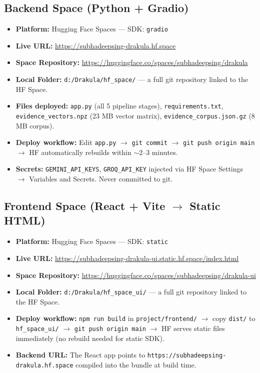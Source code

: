 \documentclass[11pt,a4paper]{article}
\begin{document}
\subsection*{Backend Space (Python + Gradio)}
\begin{itemize}[leftmargin=1.5em, itemsep=3pt]
    \item \textbf{Platform:} Hugging Face Spaces — SDK: \texttt{gradio}
    \item \textbf{Live URL:} \url{https://subhadeepsing-drakula.hf.space}
    \item \textbf{Space Repository:} \url{https://huggingface.co/spaces/subhadeepsing/drakula}
    \item \textbf{Local Folder:} \texttt{d:/Drakula/hf\_space/} — a full git repository linked to the HF Space.
    \item \textbf{Files deployed:} \texttt{app.py} (all 5 pipeline stages), \texttt{requirements.txt}, \texttt{evidence\_vectors.npz} (23 MB vector matrix), \texttt{evidence\_corpus.json.gz} (8 MB corpus).
    \item \textbf{Deploy workflow:} Edit \texttt{app.py} $\rightarrow$ \texttt{git commit} $\rightarrow$ \texttt{git push origin main} $\rightarrow$ HF automatically rebuilds within $\sim$2--3 minutes.
    \item \textbf{Secrets:} \texttt{GEMINI\_API\_KEYS}, \texttt{GROQ\_API\_KEY} injected via HF Space Settings $\rightarrow$ Variables and Secrets. Never committed to git.
\end{itemize}

\subsection*{Frontend Space (React + Vite $\rightarrow$ Static HTML)}
\begin{itemize}[leftmargin=1.5em, itemsep=3pt]
    \item \textbf{Platform:} Hugging Face Spaces — SDK: \texttt{static}
    \item \textbf{Live URL:} \url{https://subhadeepsing-drakula-ui.static.hf.space/index.html}
    \item \textbf{Space Repository:} \url{https://huggingface.co/spaces/subhadeepsing/drakula-ui}
    \item \textbf{Local Folder:} \texttt{d:/Drakula/hf\_space\_ui/} — a full git repository linked to the HF Space.
    \item \textbf{Deploy workflow:} \texttt{npm run build} in \texttt{project/frontend/} $\rightarrow$ copy \texttt{dist/} to \texttt{hf\_space\_ui/} $\rightarrow$ \texttt{git push origin main} $\rightarrow$ HF serves static files immediately (no rebuild needed for static SDK).
    \item \textbf{Backend URL:} The React app points to \texttt{https://subhadeepsing-drakula.hf.space} compiled into the bundle at build time.
\end{itemize}
\end{document}
